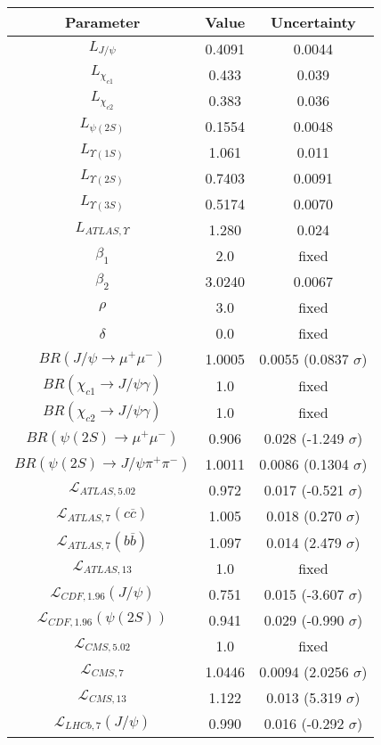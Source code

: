 \begin{table}[h!]
\centering
\begin{tabular}{c|c|c}
Parameter & Value & Uncertainty \\
\hline
$L_{J/\psi}$ & 0.4091 & 0.0044 \\
$L_{\chi_{c1}}$ & 0.433 & 0.039 \\
$L_{\chi_{c2}}$ & 0.383 & 0.036 \\
$L_{\psi(2S)}$ & 0.1554 & 0.0048 \\
$L_{\Upsilon(1S)}$ & 1.061 & 0.011 \\
$L_{\Upsilon(2S)}$ & 0.7403 & 0.0091 \\
$L_{\Upsilon(3S)}$ & 0.5174 & 0.0070 \\
$L_{ATLAS,\Upsilon}$ & 1.280 & 0.024 \\
$\beta_1$ & 2.0 & fixed \\
$\beta_2$ & 3.0240 & 0.0067 \\
$\rho$ & 3.0 & fixed \\
$\delta$ & 0.0 & fixed \\
$BR(J/\psi\rightarrow\mu^+\mu^-)$ & 1.0005 & 0.0055 (0.0837 $\sigma$) \\
$BR(\chi_{c1}\rightarrow J/\psi\gamma)$ & 1.0 & fixed \\
$BR(\chi_{c2}\rightarrow J/\psi\gamma)$ & 1.0 & fixed \\
$BR(\psi(2S)\rightarrow\mu^+\mu^-)$ & 0.906 & 0.028 (-1.249 $\sigma$) \\
$BR(\psi(2S)\rightarrow J/\psi\pi^+\pi^-)$ & 1.0011 & 0.0086 (0.1304 $\sigma$) \\
$\mathcal L_{ATLAS,5.02}$ & 0.972 & 0.017 (-0.521 $\sigma$) \\
$\mathcal L_{ATLAS,7}(c\overline c)$ & 1.005 & 0.018 (0.270 $\sigma$) \\
$\mathcal L_{ATLAS,7}(b\overline b)$ & 1.097 & 0.014 (2.479 $\sigma$) \\
$\mathcal L_{ATLAS,13}$ & 1.0 & fixed \\
$\mathcal L_{CDF,1.96}(J/\psi)$ & 0.751 & 0.015 (-3.607 $\sigma$) \\
$\mathcal L_{CDF,1.96}(\psi(2S))$ & 0.941 & 0.029 (-0.990 $\sigma$) \\
$\mathcal L_{CMS,5.02}$ & 1.0 & fixed \\
$\mathcal L_{CMS,7}$ & 1.0446 & 0.0094 (2.0256 $\sigma$) \\
$\mathcal L_{CMS,13}$ & 1.122 & 0.013 (5.319 $\sigma$) \\
$\mathcal L_{LHCb,7}(J/\psi)$ & 0.990 & 0.016 (-0.292 $\sigma$) \\

\end{tabular}
\end{table}
